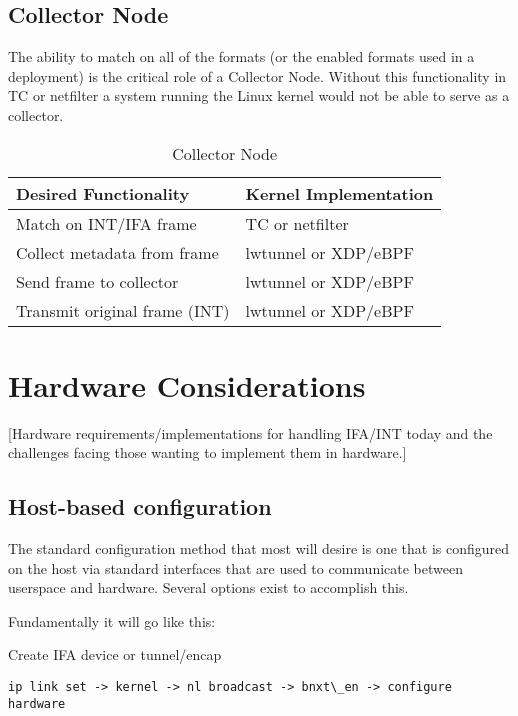 \documentclass[letterpaper,twocolumn,10pt]{article}
\begin{document}
\subsection{Collector Node}
The ability to match on all of the formats (or the enabled formats used
in a deployment) is the critical role of a Collector Node.  Without this
functionality in TC or netfilter a system running the Linux kernel would
not be able to serve as a collector.
\begin{table}[h!]
  \begin{center}
    \caption{Collector Node}
    \label{tab:table3}
    \begin{tabular}{l|l}
      \textbf{Desired Functionality} & \textbf{Kernel Implementation} \\
      \hline
      Match on INT/IFA frame & TC or netfilter \\
      \hline
      Collect metadata from frame & lwtunnel or XDP/eBPF \\
      \hline
      Send frame to collector & lwtunnel or XDP/eBPF \\
      \hline
      Transmit original frame (INT) & lwtunnel or XDP/eBPF \\
    \end{tabular}
  \end{center}
\end{table}

\section{Hardware Considerations}

[Hardware requirements/implementations for handling IFA/INT today and the
challenges facing those wanting to implement them in hardware.]

\subsection{Host-based configuration}

The standard configuration method that most will desire is one that is
configured on the host via standard interfaces that are used to
communicate between userspace and hardware.  Several options exist to
accomplish this.

Fundamentally it will go like this:

Create IFA device or tunnel/encap
\tiny
\begin{verbatim}
ip link set -> kernel -> nl broadcast -> bnxt\_en -> configure hardware
\end{verbatim}
\normalsize
\end{document}
